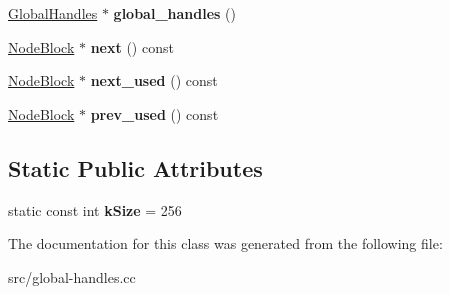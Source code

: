 \begin{DoxyCompactItemize}
\item 
\hypertarget{classv8_1_1internal_1_1_global_handles_1_1_node_block_a0e667a118ed6a7f2d62dbc23cbed58a1}{}\hyperlink{classv8_1_1internal_1_1_global_handles}{Global\+Handles} $\ast$ {\bfseries global\+\_\+handles} ()\label{classv8_1_1internal_1_1_global_handles_1_1_node_block_a0e667a118ed6a7f2d62dbc23cbed58a1}

\item 
\hypertarget{classv8_1_1internal_1_1_global_handles_1_1_node_block_ac431f9e791c841f740b3d2841531648d}{}\hyperlink{classv8_1_1internal_1_1_global_handles_1_1_node_block}{Node\+Block} $\ast$ {\bfseries next} () const \label{classv8_1_1internal_1_1_global_handles_1_1_node_block_ac431f9e791c841f740b3d2841531648d}

\item 
\hypertarget{classv8_1_1internal_1_1_global_handles_1_1_node_block_ab59e6a8f3be8829108600a58e86e55f5}{}\hyperlink{classv8_1_1internal_1_1_global_handles_1_1_node_block}{Node\+Block} $\ast$ {\bfseries next\+\_\+used} () const \label{classv8_1_1internal_1_1_global_handles_1_1_node_block_ab59e6a8f3be8829108600a58e86e55f5}

\item 
\hypertarget{classv8_1_1internal_1_1_global_handles_1_1_node_block_af721dba7c1a51441d44257897972b996}{}\hyperlink{classv8_1_1internal_1_1_global_handles_1_1_node_block}{Node\+Block} $\ast$ {\bfseries prev\+\_\+used} () const \label{classv8_1_1internal_1_1_global_handles_1_1_node_block_af721dba7c1a51441d44257897972b996}

\end{DoxyCompactItemize}
\subsection*{Static Public Attributes}
\begin{DoxyCompactItemize}
\item 
\hypertarget{classv8_1_1internal_1_1_global_handles_1_1_node_block_ab72b30a48c1f494bf09e1cb707ffda6a}{}static const int {\bfseries k\+Size} = 256\label{classv8_1_1internal_1_1_global_handles_1_1_node_block_ab72b30a48c1f494bf09e1cb707ffda6a}

\end{DoxyCompactItemize}


The documentation for this class was generated from the following file\+:\begin{DoxyCompactItemize}
\item 
src/global-\/handles.\+cc\end{DoxyCompactItemize}
